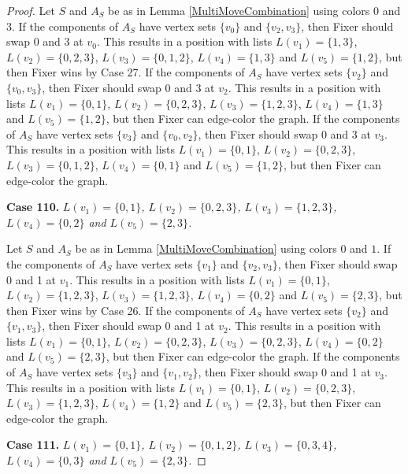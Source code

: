\documentclass[12pt]{amsart}
\theoremstyle{plain}
\theoremstyle{definition}
\theoremstyle{remark}
\begin{document}
\begin{proof}
Let $S$ and $A_S$ be as in Lemma \ref{MultiMoveCombination} using colors $0$ and $3$. If the components of $A_S$ have vertex sets $\{v_0\}$ and $\{v_2, v_3\}$, then Fixer should swap 0 and 3 at $v_0$. This results in a position with lists $L(v_1) = \{1, 3\}$, $L(v_2) = \{0, 2, 3\}$, $L(v_3) = \{0, 1, 2\}$, $L(v_4) = \{1, 3\}$ and $L(v_5) = \{1, 2\}$, but then Fixer wins by Case 27.
If the components of $A_S$ have vertex sets $\{v_2\}$ and $\{v_0, v_3\}$, then Fixer should swap 0 and 3 at $v_2$. This results in a position with lists $L(v_1) = \{0, 1\}$, $L(v_2) = \{0, 2, 3\}$, $L(v_3) = \{1, 2, 3\}$, $L(v_4) = \{1, 3\}$ and $L(v_5) = \{1, 2\}$, but then Fixer can edge-color the graph.
If the components of $A_S$ have vertex sets $\{v_3\}$ and $\{v_0, v_2\}$, then Fixer should swap 0 and 3 at $v_3$. This results in a position with lists $L(v_1) = \{0, 1\}$, $L(v_2) = \{0, 2, 3\}$, $L(v_3) = \{0, 1, 2\}$, $L(v_4) = \{0, 1\}$ and $L(v_5) = \{1, 2\}$, but then Fixer can edge-color the graph.

\noindent\textbf{Case 110.  }\textit{$L(v_1) = \{0, 1\}$, $L(v_2) = \{0, 2, 3\}$, $L(v_3) = \{1, 2, 3\}$, $L(v_4) = \{0, 2\}$ and $L(v_5) = \{2, 3\}$.}

Let $S$ and $A_S$ be as in Lemma \ref{MultiMoveCombination} using colors $0$ and $1$. If the components of $A_S$ have vertex sets $\{v_1\}$ and $\{v_2, v_3\}$, then Fixer should swap 0 and 1 at $v_1$. This results in a position with lists $L(v_1) = \{0, 1\}$, $L(v_2) = \{1, 2, 3\}$, $L(v_3) = \{1, 2, 3\}$, $L(v_4) = \{0, 2\}$ and $L(v_5) = \{2, 3\}$, but then Fixer wins by Case 26.
If the components of $A_S$ have vertex sets $\{v_2\}$ and $\{v_1, v_3\}$, then Fixer should swap 0 and 1 at $v_2$. This results in a position with lists $L(v_1) = \{0, 1\}$, $L(v_2) = \{0, 2, 3\}$, $L(v_3) = \{0, 2, 3\}$, $L(v_4) = \{0, 2\}$ and $L(v_5) = \{2, 3\}$, but then Fixer can edge-color the graph.
If the components of $A_S$ have vertex sets $\{v_3\}$ and $\{v_1, v_2\}$, then Fixer should swap 0 and 1 at $v_3$. This results in a position with lists $L(v_1) = \{0, 1\}$, $L(v_2) = \{0, 2, 3\}$, $L(v_3) = \{1, 2, 3\}$, $L(v_4) = \{1, 2\}$ and $L(v_5) = \{2, 3\}$, but then Fixer can edge-color the graph.

\noindent\textbf{Case 111.  }\textit{$L(v_1) = \{0, 1\}$, $L(v_2) = \{0, 1, 2\}$, $L(v_3) = \{0, 3, 4\}$, $L(v_4) = \{0, 3\}$ and $L(v_5) = \{2, 3\}$.}


\end{proof}
\end{document}
